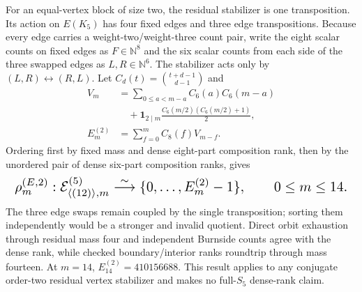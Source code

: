\documentclass{article}
\newcommand{\fitmath}[1]{\resizebox{0.99\linewidth}{!}{$\displaystyle #1$}}
\begin{document}
For an equal-vertex block of size two, the residual stabilizer is one
transposition. Its action on $E(K_5)$ has four fixed edges and three edge
transpositions. Because every edge carries a weight-two/weight-three count pair,
write the eight scalar counts on fixed edges as $F\in\mathbb N^8$ and the six
scalar counts from each side of the three swapped edges as
$L,R\in\mathbb N^6$. The stabilizer acts only by $(L,R)\leftrightarrow(R,L)$.
Let $C_d(t)=\binom{t+d-1}{d-1}$ and
\[
  \begin{aligned}
    V_m&=\sum_{0\leq a<m-a}C_6(a)C_6(m-a)\\
      &\quad+\mathbf 1_{2\mid m}
        \frac{C_6(m/2)(C_6(m/2)+1)}{2},\\
    E^{(2)}_m&=\sum_{f=0}^{m}C_8(f)V_{m-f}.
  \end{aligned}
\]
Ordering first by fixed mass and dense eight-part composition rank, then by the
unordered pair of dense six-part composition ranks, gives
\begin{equation}
  \fitmath{%
    \rho^{(E,2)}_m:
      \mathcal E^{(5)}_{\langle(12)\rangle,m}
      \overset{\sim}{\longrightarrow}\{0,\ldots,E^{(2)}_m-1\},
    \qquad 0\leq m\leq14.
  }
  \label{eq:optimization-crazy-preimage-cube-quintuple-s2-edge-ranking}
\end{equation}
The three edge swaps remain coupled by the single transposition; sorting them
independently would be a stronger and invalid quotient. Direct orbit exhaustion
through residual mass four and independent Burnside counts agree with the dense
rank, while checked boundary/interior ranks roundtrip through mass fourteen.
At $m=14$, $E^{(2)}_{14}=410156688$. This result applies to any conjugate
order-two residual vertex stabilizer and makes no full-$S_5$ dense-rank claim.
\end{document}
